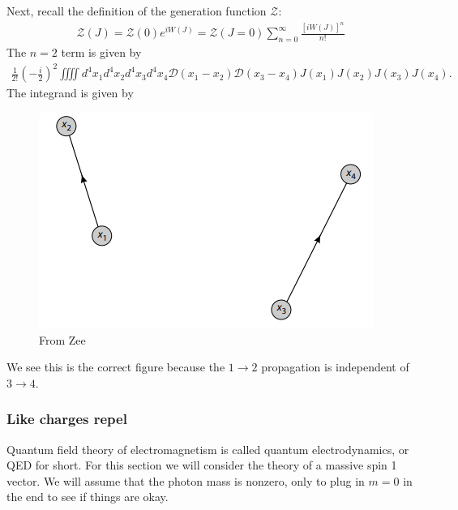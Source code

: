 \documentclass{book}
\theoremstyle{definition}
\newcommand{\f}[2]{\frac{#1}{#2}}
\newcommand{\lp}{\left(}
\newcommand{\rp}{\right)}
\newcommand{\D}{\mathcal{D}}
\begin{document}
Next, recall the definition of the generation function $\mathcal{Z}$:
\begin{align}
\boxed{\mathcal{Z}(J) = \mathcal{Z}(0)e^{iW(J)} = \mathcal{Z}(J=0)\sum^\infty_{n=0}\f{[iW(J)]^n}{n!}}
\end{align}
The $n=2$ term is given by
\begin{align}
\f{1}{2!}\lp -\f{i}{2} \rp^2 \iiiint d^4x_1d^4x_2d^4x_3d^4x_4\D(x_1 - x_2)\D(x_3 - x_4)J(x_1)J(x_2)J(x_3)J(x_4).
\end{align}
The integrand is given by
\begin{figure}[!htb]
	\centering
	\includegraphics[scale=0.6]{feynman-2}
	\caption{From Zee}
\end{figure}
We see this is the correct figure because the $1\to 2$ propagation is independent of $3\to 4$. 




















\subsubsection{Like charges repel}

Quantum field theory of electromagnetism is called quantum electrodynamics, or QED for short. For this section we will consider the theory of a massive spin 1 vector. We will assume that the photon mass is nonzero, only to plug in $m=0$ in the end to see if things are okay. \\
\end{document}
